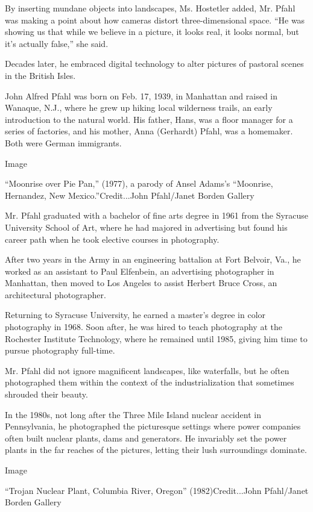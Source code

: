 By inserting mundane objects into landscapes, Ms. Hostetler added, Mr.
Pfahl was making a point about how cameras distort three-dimensional
space. ``He was showing us that while we believe in a picture, it looks
real, it looks normal, but it's actually false,'' she said.

Decades later, he embraced digital technology to alter pictures of
pastoral scenes in the British Isles.

John Alfred Pfahl was born on Feb. 17, 1939, in Manhattan and raised in
Wanaque, N.J., where he grew up hiking local wilderness trails, an early
introduction to the natural world. His father, Hans, was a floor manager
for a series of factories, and his mother, Anna (Gerhardt) Pfahl, was a
homemaker. Both were German immigrants.

Image

``Moonrise over Pie Pan,'' (1977), a parody of Ansel Adams's ``Moonrise,
Hernandez, New Mexico.''Credit...John Pfahl/Janet Borden Gallery

Mr. Pfahl graduated with a bachelor of fine arts degree in 1961 from the
Syracuse University School of Art, where he had majored in advertising
but found his career path when he took elective courses in photography.

After two years in the Army in an engineering battalion at Fort Belvoir,
Va., he worked as an assistant to Paul Elfenbein, an advertising
photographer in Manhattan, then moved to Los Angeles to assist Herbert
Bruce Cross, an architectural photographer.

Returning to Syracuse University, he earned a master's degree in color
photography in 1968. Soon after, he was hired to teach photography at
the Rochester Institute Technology, where he remained until 1985, giving
him time to pursue photography full-time.

Mr. Pfahl did not ignore magnificent landscapes, like waterfalls, but he
often photographed them within the context of the industrialization that
sometimes shrouded their beauty.

In the 1980s, not long after the Three Mile Island nuclear accident in
Pennsylvania, he photographed the picturesque settings where power
companies often built nuclear plants, dams and generators. He invariably
set the power plants in the far reaches of the pictures, letting their
lush surroundings dominate.

Image

``Trojan Nuclear Plant, Columbia River, Oregon'' (1982)Credit...John
Pfahl/Janet Borden Gallery

